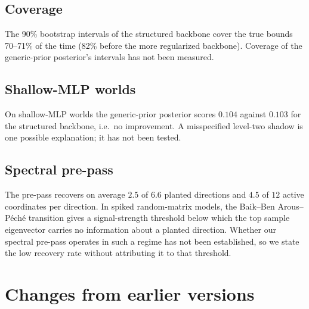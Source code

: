 \documentclass[11pt]{article}
\theoremstyle{definition}
\theoremstyle{remark}
\begin{document}
\subsection{Coverage}
The 90\% bootstrap intervals of the structured backbone cover the true bounds 70--71\% of the time
(82\% before the more regularized backbone). Coverage of the generic-prior posterior's intervals has
not been measured.

\subsection{Shallow-MLP worlds}
On shallow-MLP worlds the generic-prior posterior scores $0.104$ against $0.103$ for the structured
backbone, i.e.\ no improvement. A misspecified level-two shadow is one possible explanation; it has not been
tested.

\subsection{Spectral pre-pass}
The pre-pass recovers on average $2.5$ of $6.6$ planted directions and $4.5$ of $12$ active
coordinates per direction. In spiked random-matrix models, the Baik--Ben Arous--P\'ech\'e transition
\cite{BBP2005} gives a signal-strength threshold below which the top sample eigenvector carries no
information about a planted direction. Whether our spectral pre-pass operates in such a regime has
not been established, so we state the low recovery rate without attributing it to that threshold.

\section{Changes from earlier versions}\label{app:changes}
\end{document}
